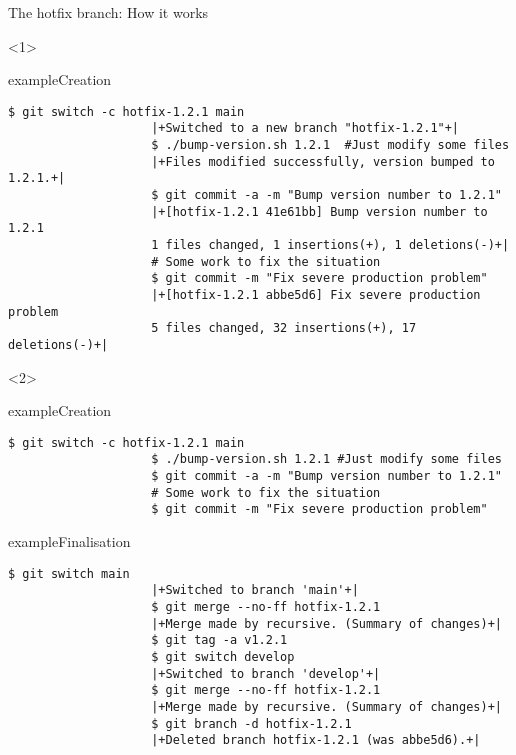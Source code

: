 \documentclass[usenames,svgnames,14pt]{beamer}
\begin{document}
\begin{frame}[fragile,c]{The hotfix branch: How it works}
    \vspace{-6mm}
    \begin{overlayarea}{\textwidth}{0.8\textheight}
        \begin{onlyenv}<1>
            \begin{varblock}{example}{Creation}
                \begin{lstlisting}[style=MyBash]
                    $ git switch -c hotfix-1.2.1 main
                    |+Switched to a new branch "hotfix-1.2.1"+|
                    $ ./bump-version.sh 1.2.1  #Just modify some files
                    |+Files modified successfully, version bumped to 1.2.1.+|
                    $ git commit -a -m "Bump version number to 1.2.1"
                    |+[hotfix-1.2.1 41e61bb] Bump version number to 1.2.1
                    1 files changed, 1 insertions(+), 1 deletions(-)+|
                    # Some work to fix the situation
                    $ git commit -m "Fix severe production problem"
                    |+[hotfix-1.2.1 abbe5d6] Fix severe production problem
                    5 files changed, 32 insertions(+), 17 deletions(-)+|
                \end{lstlisting}
            \end{varblock}
        \end{onlyenv}
        \begin{onlyenv}<2>
            \begin{varblock}{example}{Creation}
                \begin{lstlisting}[style=MyBash]
                    $ git switch -c hotfix-1.2.1 main
                    $ ./bump-version.sh 1.2.1 #Just modify some files
                    $ git commit -a -m "Bump version number to 1.2.1"
                    # Some work to fix the situation
                    $ git commit -m "Fix severe production problem"
                \end{lstlisting}
            \end{varblock}
            \vspace{-3mm}
            \begin{varblock}{example}{Finalisation}
                \begin{lstlisting}[style=MyBash]
                    $ git switch main
                    |+Switched to branch 'main'+|
                    $ git merge --no-ff hotfix-1.2.1
                    |+Merge made by recursive. (Summary of changes)+|
                    $ git tag -a v1.2.1
                    $ git switch develop
                    |+Switched to branch 'develop'+|
                    $ git merge --no-ff hotfix-1.2.1
                    |+Merge made by recursive. (Summary of changes)+|
                    $ git branch -d hotfix-1.2.1
                    |+Deleted branch hotfix-1.2.1 (was abbe5d6).+|
                \end{lstlisting}
            \end{varblock}
        \end{onlyenv}
    \end{overlayarea}
\end{frame}
\end{document}
